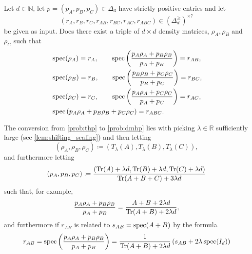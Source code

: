 \documentclass[notitlepage]{article}
\begin{document}
\begin{prob}
    \label{prob:dmhp}
    Let $d \in \mathbb N$, let $p = (p_A, p_B, p_C) \in \Delta_{3}$ have strictly positive entries and let
    \begin{equation}
        (r_{A}, r_{B}, r_{C}, r_{AB}, r_{BC}, r_{AC}, r_{ABC}) \in (\Delta_d^{\geq})^{\times 7}
    \end{equation}
    be given as input.
    Does there exist a triple of $d\times d$ density matrices, $\rho_{A}, \rho_{B}$ and $\rho_{C}$ such that
    \begin{align}
        \begin{split}
            &\operatorname{spec}(\rho_{A}) = r_{A}, \qquad \operatorname{spec}\left(\frac{p_A \rho_A + p_B \rho_B}{p_A + p_B}\right) = r_{AB}, \\
            &\operatorname{spec}(\rho_{B}) = r_{B}, \qquad \operatorname{spec}\left(\frac{p_B \rho_B + p_C \rho_C}{p_B + p_C}\right) = r_{BC}, \\
            &\operatorname{spec}(\rho_{C}) = r_{C}, \qquad \operatorname{spec} \left(\frac{p_A \rho_A + p_C \rho_C}{p_A + p_C}\right) = r_{AC}, \\
            &\operatorname{spec}\left(p_A \rho_A + p_B \rho_B + p_C \rho_C\right) = r_{ABC}.
        \end{split}
    \end{align}
\end{prob}

\begin{rem}
    The conversion from \cref{prob:thp} to \cref{prob:dmhp} lies with picking $\lambda \in \mathbb R$ sufficiently large (see \cref{lem:shifting_scaling}) and then letting
    \begin{equation}
        (\rho_{A}, \rho_{B}, \rho_{C}) \coloneqq (T_{\lambda}(A), T_{\lambda}(B), T_{\lambda}(C)),
    \end{equation}
    and furthermore letting
    \begin{equation}
        (p_A, p_B, p_C) \coloneqq \frac{(\operatorname{Tr}(A)+\lambda d,\operatorname{Tr}(B)+\lambda d,\operatorname{Tr}(C)+\lambda d)}{\operatorname{Tr}(A+B+C) + 3 \lambda d}
    \end{equation}
    such that, for example,
    \begin{equation}
        \frac{p_{A} \rho_{A} + p_{B} \rho_{B}}{p_{A} + p_{B}} = \frac{A + B + 2 \lambda d}{\operatorname{Tr}(A+B) + 2 \lambda d},
    \end{equation}
    and furthermore if $r_{AB}$ is related to $s_{AB} = \operatorname{spec}(A+B)$ by the formula
    \begin{equation}
        r_{AB} = \operatorname{spec}\left(\frac{p_{A} \rho_{A} + p_{B} \rho_{B}}{p_{A} + p_{B}}\right) = \frac{1}{\operatorname{Tr}(A+B) + 2 \lambda d} \left(s_{AB} + 2 \lambda \operatorname{spec}(I_d)\right)
    \end{equation}
\end{rem}
\end{document}
